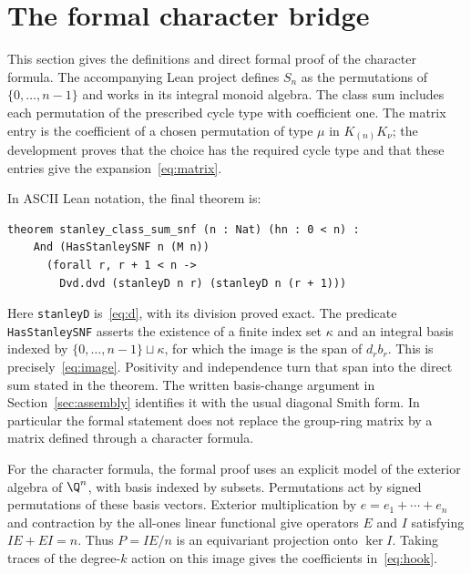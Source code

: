 \section{The formal character bridge}
This section gives the definitions and direct formal proof of the character formula.
The accompanying Lean project defines $S_n$ as the permutations of
$\{0,\ldots,n-1\}$ and works in its integral monoid algebra.
The class sum includes each permutation of the prescribed cycle type
with coefficient one. The matrix entry is the coefficient of a chosen
permutation of type $\mu$ in $K_{(n)}K_\nu$; the development proves
that the choice has the required cycle type and that these entries
give the expansion~\eqref{eq:matrix}.

In ASCII Lean notation, the final theorem is:
\begin{verbatim}
theorem stanley_class_sum_snf (n : Nat) (hn : 0 < n) :
    And (HasStanleySNF n (M n))
      (forall r, r + 1 < n ->
        Dvd.dvd (stanleyD n r) (stanleyD n (r + 1)))
\end{verbatim}
Here \texttt{stanleyD} is~\eqref{eq:d}, with its division proved exact.
The predicate \texttt{HasStanleySNF} asserts the existence of a finite
index set $\kappa$ and an integral basis indexed by
$\{0,\ldots,n-1\}\sqcup\kappa$, for which the image is the span of
$d_r b_r$. This is precisely~\eqref{eq:image}. Positivity and
independence turn that span into the direct sum stated in the theorem.
The written basis-change argument in Section~\ref{sec:assembly} identifies it with the
usual diagonal Smith form. In particular the formal statement does not
replace the group-ring matrix by a matrix defined through a character
formula.

For the character formula, the formal proof uses an explicit model
of the exterior algebra of $\Q^n$, with basis indexed by subsets.
Permutations act by signed permutations of these basis vectors.
Exterior multiplication by $e=e_1+\cdots+e_n$ and contraction by
the all-ones linear functional give operators $E$ and $I$ satisfying
$IE+EI=n$. Thus $P=IE/n$ is an equivariant projection onto
$\ker I$. Taking traces of the degree-$k$ action on this image gives
the coefficients in~\eqref{eq:hook}.

